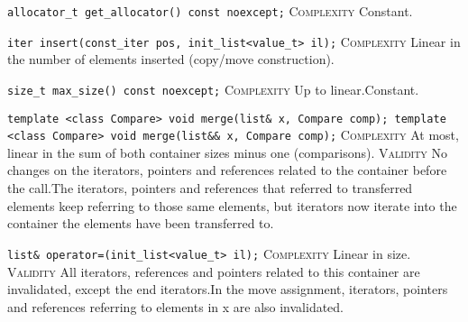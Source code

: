 \noindent{}\hspace*{0.25em}\lstinline[basicstyle=\ttfamily\color{cgreen}]{allocator_t get_allocator() const noexcept;} \textsc{Complexity} Constant.\\\vspace{-0.6em}

\noindent{}\hspace*{0.25em}\lstinline[basicstyle=\ttfamily\color{corange}]{iter insert(const_iter pos, init_list<value_t> il);} \textsc{Complexity} Linear in the number of elements inserted (copy/move construction).\\\vspace{-0.6em}

\noindent{}\hspace*{0.25em}\lstinline[basicstyle=\ttfamily\color{corange}]{size_t max_size() const noexcept;} \textsc{Complexity} Up to linear.Constant.\\\vspace{-0.6em}

\noindent{}\hspace*{0.25em}\lstinline[basicstyle=\ttfamily\color{corange}]{template <class Compare> void merge(list& x, Compare comp); template <class Compare> void merge(list&& x, Compare comp);} \textsc{Complexity} At most, linear in the sum of both container sizes minus one (comparisons). \textsc{Validity} No changes on the iterators, pointers and references related to the container before the call.The iterators, pointers and references that referred to transferred elements keep referring to those same elements, but iterators now iterate into the container the elements have been transferred to.\\\vspace{-0.6em}

\noindent{}\hspace*{0.25em}\lstinline[basicstyle=\ttfamily\color{corange}]{list& operator=(init_list<value_t> il);} \textsc{Complexity} Linear in size. \textsc{Validity} All iterators, references and pointers related to this container are invalidated, except the end iterators.In the move assignment, iterators, pointers and references referring to elements in x are also invalidated.\\\vspace{-0.6em}

